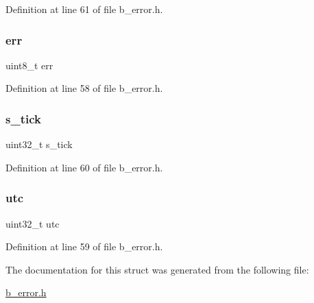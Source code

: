 Definition at line 61 of file b\+\_\+error.\+h.

\mbox{\label{structb_error_info__t_a4028993b4bc2c4b88683e7cffeb01429}} 
\subsubsection{\texorpdfstring{err}{err}}
{\footnotesize\ttfamily uint8\+\_\+t err}



Definition at line 58 of file b\+\_\+error.\+h.

\mbox{\label{structb_error_info__t_a75e846b74ee697f342eb8f166cce8dcc}} 
\subsubsection{\texorpdfstring{s\+\_\+tick}{s\_tick}}
{\footnotesize\ttfamily uint32\+\_\+t s\+\_\+tick}



Definition at line 60 of file b\+\_\+error.\+h.

\mbox{\label{structb_error_info__t_ac33a21166535be799d0d3743c23ad044}} 
\subsubsection{\texorpdfstring{utc}{utc}}
{\footnotesize\ttfamily uint32\+\_\+t utc}



Definition at line 59 of file b\+\_\+error.\+h.



The documentation for this struct was generated from the following file\+:\begin{DoxyCompactItemize}
\item 
\mbox{\hyperlink{b__error_8h}{b\+\_\+error.\+h}}\end{DoxyCompactItemize}
